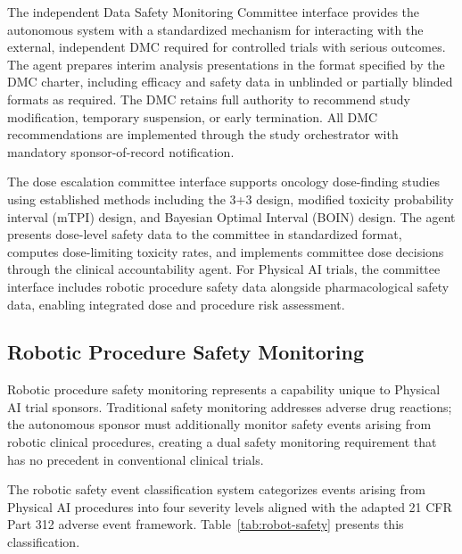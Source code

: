 The independent Data Safety Monitoring Committee interface provides the autonomous system
with a standardized mechanism for interacting with the external, independent DMC
required for controlled trials with serious outcomes. The agent prepares interim analysis
presentations in the format specified by the DMC charter, including efficacy and safety
data in unblinded or partially blinded formats as required. The DMC retains full authority
to recommend study modification, temporary suspension, or early termination. All DMC
recommendations are implemented through the study orchestrator with mandatory
sponsor-of-record notification.

The dose escalation committee interface supports oncology dose-finding studies using
established methods including the 3+3 design, modified toxicity probability interval
(mTPI) design, and Bayesian Optimal Interval (BOIN) design. The agent presents
dose-level safety data to the committee in standardized format, computes dose-limiting
toxicity rates, and implements committee dose decisions through the clinical
accountability agent. For Physical AI trials, the committee interface includes robotic
procedure safety data alongside pharmacological safety data, enabling integrated
dose and procedure risk assessment.

\subsection{Robotic Procedure Safety Monitoring}

Robotic procedure safety monitoring represents a capability unique to Physical AI trial
sponsors. Traditional safety monitoring addresses adverse drug reactions; the autonomous
sponsor must additionally monitor safety events arising from robotic clinical procedures,
creating a dual safety monitoring requirement that has no precedent in conventional
clinical trials.

The robotic safety event classification system categorizes events arising from Physical
AI procedures into four severity levels aligned with the adapted 21 CFR Part 312
\cite{cfr312-adapt} adverse event framework. Table~\ref{tab:robot-safety} presents
this classification.

